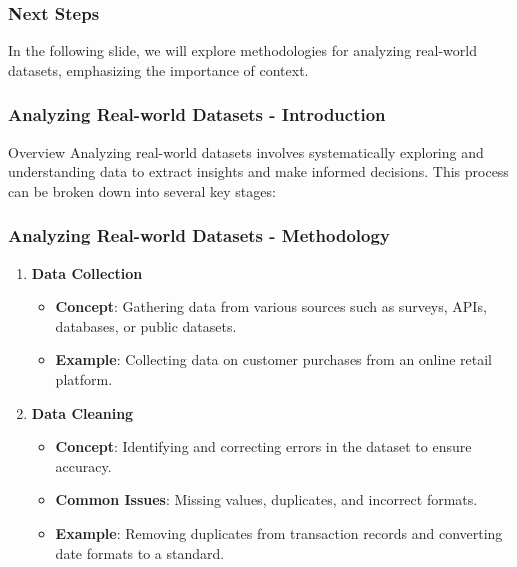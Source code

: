 \documentclass[aspectratio=169]{beamer}
\begin{document}
\begin{frame}[fragile]
    \frametitle{Next Steps}
    In the following slide, we will explore methodologies for analyzing real-world datasets, emphasizing the importance of context.
\end{frame}

\begin{frame}[fragile]
    \frametitle{Analyzing Real-world Datasets - Introduction}
    \begin{block}{Overview}
        Analyzing real-world datasets involves systematically exploring and understanding data to extract insights and make informed decisions. This process can be broken down into several key stages:
    \end{block}
\end{frame}

\begin{frame}[fragile]
    \frametitle{Analyzing Real-world Datasets - Methodology}
    \begin{enumerate}
        \item \textbf{Data Collection}
            \begin{itemize}
                \item \textbf{Concept}: Gathering data from various sources such as surveys, APIs, databases, or public datasets.
                \item \textbf{Example}: Collecting data on customer purchases from an online retail platform.
            \end{itemize}
        
        \item \textbf{Data Cleaning}
            \begin{itemize}
                \item \textbf{Concept}: Identifying and correcting errors in the dataset to ensure accuracy.
                \item \textbf{Common Issues}: Missing values, duplicates, and incorrect formats.
                \item \textbf{Example}: Removing duplicates from transaction records and converting date formats to a standard.
            \end{itemize}
    \end{enumerate}
\end{frame}
\end{document}
